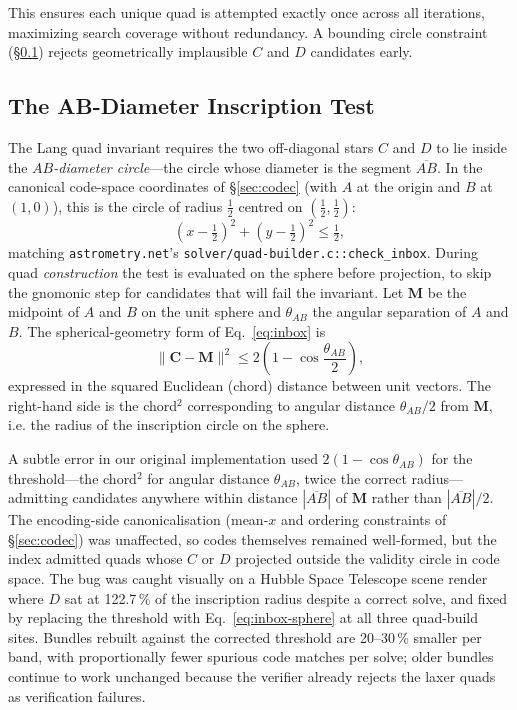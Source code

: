 \documentclass[twocolumn, 10pt]{article}
\begin{document}
This ensures each unique quad is attempted exactly once across all
iterations, maximizing search coverage without redundancy. A bounding
circle constraint (\S\ref{sec:abcircle}) rejects geometrically
implausible $C$ and $D$ candidates early.

\subsection{The AB-Diameter Inscription Test} \label{sec:abcircle}

The Lang quad invariant requires the two off-diagonal stars $C$ and
$D$ to lie inside the \emph{$AB$-diameter circle}---the circle whose
diameter is the segment $\overline{AB}$. In the canonical code-space
coordinates of \S\ref{sec:codec} (with $A$ at the origin and $B$ at
$(1, 0)$), this is the circle of radius $\tfrac{1}{2}$ centred on
$(\tfrac{1}{2}, \tfrac{1}{2})$:
\begin{equation} \label{eq:inbox}
    \left( x - \tfrac{1}{2}\right)^{\!2}
    + \left( y - \tfrac{1}{2}\right)^{\!2} \le \tfrac{1}{2},
\end{equation}
matching \texttt{astrometry.net}'s
\texttt{solver/quad-builder.c::check\_inbox}. During quad
\emph{construction} the test is evaluated on the sphere before
projection, to skip the gnomonic step for candidates that will fail
the invariant. Let $\mathbf{M}$ be the midpoint of $A$ and $B$ on the
unit sphere and $\theta_{AB}$ the angular separation of $A$ and $B$.
The spherical-geometry form of Eq.~\ref{eq:inbox} is
\begin{equation} \label{eq:inbox-sphere}
    \|\mathbf{C} - \mathbf{M}\|^{2} \le 2\!\left(1 - \cos\frac{\theta_{AB}}{2}\right),
\end{equation}
expressed in the squared Euclidean (chord) distance between unit
vectors. The right-hand side is the chord$^{2}$ corresponding to
angular distance $\theta_{AB}/2$ from $\mathbf{M}$, i.e. the radius
of the inscription circle on the sphere.

A subtle error in our original implementation used
$2(1 - \cos\theta_{AB})$ for the threshold---the chord$^{2}$ for
angular distance $\theta_{AB}$, twice the correct radius---admitting
candidates anywhere within distance $|\overline{AB}|$ of
$\mathbf{M}$ rather than $|\overline{AB}|/2$. The encoding-side
canonicalisation (mean-$x$ and ordering constraints of
\S\ref{sec:codec}) was unaffected, so codes themselves remained
well-formed, but the index admitted quads whose $C$ or $D$ projected
outside the validity circle in code space. The bug was caught
visually on a Hubble Space Telescope scene render where $D$ sat at
122.7\,\% of the inscription radius despite a correct solve, and
fixed by replacing the threshold with Eq.~\ref{eq:inbox-sphere} at
all three quad-build sites. Bundles rebuilt against the corrected
threshold are 20--30\,\% smaller per band, with proportionally fewer
spurious code matches per solve; older bundles continue to work
unchanged because the verifier already rejects the laxer quads as
verification failures.
\end{document}
